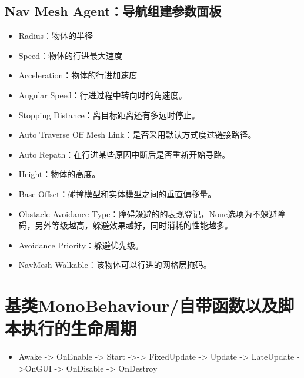 \documentclass[9pt, b5paper]{article}
\begin{document}
\subsection{Nav Mesh Agent：导航组建参数面板　　　　}
\label{sec:orgcbd518f}
\begin{itemize}
\item Radius：物体的半径
\item Speed：物体的行进最大速度
\item Acceleration：物体的行进加速度
\item Augular Speed：行进过程中转向时的角速度。
\item Stopping Distance：离目标距离还有多远时停止。
\item Auto Traverse Off Mesh Link：是否采用默认方式度过链接路径。
\item Auto Repath：在行进某些原因中断后是否重新开始寻路。
\item Height：物体的高度。
\item Base Offset：碰撞模型和实体模型之间的垂直偏移量。
\item Obstacle Avoidance Type：障碍躲避的的表现登记，None选项为不躲避障碍，另外等级越高，躲避效果越好，同时消耗的性能越多。
\item Avoidance Priority：躲避优先级。
\item NavMesh Walkable：该物体可以行进的网格层掩码。
\end{itemize}

\section{基类MonoBehaviour/自带函数以及脚本执行的生命周期}
\label{sec:org7a21080}
\begin{itemize}
\item Awake -> OnEnable -> Start ->-> FixedUpdate -> Update  -> LateUpdate ->OnGUI -> OnDisable -> OnDestroy
\end{itemize}
\end{document}
